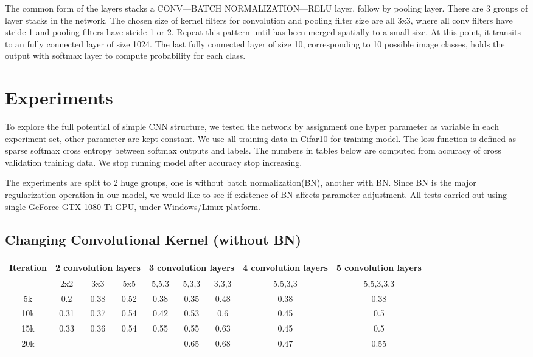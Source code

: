 \documentclass[journal,onecolumn]{IEEEtran}
\begin{document}
The common form of the layers stacks a CONV---BATCH NORMALIZATION---RELU layer, follow by pooling layer. There are 3 groups of layer stacks in the network. The chosen size of kernel filters for convolution and pooling filter size are all 3x3, where all conv filters have stride 1 and pooling filters have stride 1 or 2. Repeat this pattern until has been merged spatially to a small size. At this point, it transits to an fully connected layer of size 1024. The last fully connected layer of size 10, corresponding to 10 possible image classes, holds the output with softmax layer to compute probability for each class.


\section{Experiments}
To explore the full potential of simple CNN structure, we tested the network by assignment one hyper parameter as variable in each experiment set, other parameter are kept constant. We use all training data in Cifar10 for training model. The loss function is defined as sparse softmax cross  entropy between softmax outputs and labels. The numbers in tables below are computed from accuracy of cross validation training data. We stop running model after accuracy stop increasing.

The experiments are split to 2 huge groups, one is without batch normalization(BN), another with BN. Since BN is the major regularization operation in our model, we would like to see if existence of BN affects parameter adjustment. All tests carried out using single GeForce GTX 1080 Ti GPU, under Windows/Linux platform. 

\subsection{Changing Convolutional Kernel (without BN)}

\begin{tabular}{*9c}
  \hline
Iteration & \multicolumn{3}{c}{2 convolution layers} & \multicolumn{3}{c}{3 convolution layers} & \multicolumn{1}{c}{4 convolution layers} & \multicolumn{1}{c}{5 convolution layers} \\
\hline
{} & 2x2 & 3x3 & 5x5 & 5,5,3 & 5,3,3 & 3,3,3 & 5,5,3,3 & 5,5,3,3,3 \\
\hline
5k & 0.2 & 0.38 & 0.52 & 0.38 & 0.35 & 0.48 & 0.38 & 0.38 \\
10k & 0.31 & 0.37 & 0.54 & 0.42 & 0.53 & 0.6 & 0.45 & 0.5 \\
15k & 0.33 & 0.36 & 0.54 & 0.55 & 0.55 & 0.63 & 0.45 & 0.5 \\
20k & {} & {} & {} & {} & 0.65 & 0.68 & 0.47 & 0.55 \\
\hline
\end{tabular}
\end{document}
